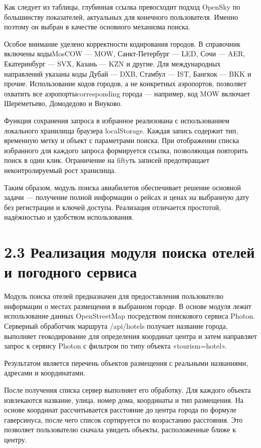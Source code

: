 \documentclass[14pt,a4paper,oneside]{extreport}
\begin{document}
Как следует из таблицы, глубинная ссылка превосходит подход OpenSky по большинству показателей, актуальных для конечного пользователя. Именно поэтому он выбран в качестве основного механизма поиска.

Особое внимание уделено корректности кодирования городов. В справочник включены кодыMosCOW — MOW, Санкт-Петербург — LED, Сочи — AER, Екатеринбург — SVX, Казань — KZN и другие. Для международных направлений указаны коды Дубай — DXB, Стамбул — IST, Бангкок — BKK и прочие. Использование кодов городов, а не конкретных аэропортов, позволяет охватить все аэропортыcorresponding города — например, код MOW включает Шереметьево, Домодедово и Внуково.

Функция сохранения запроса в избранное реализована с использованием локального хранилища браузера localStorage. Каждая запись содержит тип, временную метку и объект с параметрами поиска. При отображении списка избранного для каждого запроса формируется ссылка, позволяющая повторить поиск в один клик. Ограничение на fiftyть записей предотвращает неконтролируемый рост хранилища.

Таким образом, модуль поиска авиабилетов обеспечивает решение основной задачи — получение полной информации о рейсах и ценах на выбранную дату без регистрации и ключей доступа. Реализация отличается простотой, надёжностью и удобством использования.


\section*{2.3 Реализация модуля поиска отелей и погодного сервиса}

Модуль поиска отелей предназначен для предоставления пользователю информации о местах размещения в выбранном городе. В основе модуля лежит использование данных OpenStreetMap посредством поискового сервиса Photon. Серверный обработчик маршрута /api/hotels получает название города, выполняет геокодирование для определения координат центра и затем направляет запрос к сервису Photon с фильтром по типу объекта «tourism=hotel».

Результатом является перечень объектов размещения с реальными названиями, адресами и координатами.

После получения списка сервер выполняет его обработку. Для каждого объекта извлекаются название, улица, номер дома, координаты и тип размещения. На основе координат рассчитывается расстояние до центра города по формуле гаверсинуса, после чего список сортируется по возрастанию расстояния. Это позволяет пользователю сначала увидеть объекты, расположенные ближе к центру.
\end{document}
